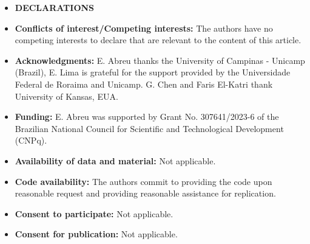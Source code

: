\documentclass[11pt]{article}
\begin{document}
\begin{itemize}
	\item[] {\bf DECLARATIONS}
	
	\vspace{-2mm}
	\item[] {\bf Conflicts of interest/Competing interests:} The authors have no competing interests to declare that are relevant to the content of this article.
	
	\vspace{-2mm}
	\item[] {\bf Acknowledgments:} E. Abreu thanks the University of Campinas - Unicamp (Brazil), E. Lima is grateful for the support provided by the Universidade Federal de Roraima and Unicamp. G. Chen and Faris El-Katri thank University of Kansas, EUA.
	
	\vspace{-2mm}
	\item[] {\bf Funding:} E. Abreu was supported by Grant No. 307641/2023-6 of the Brazilian National Council for Scientific and Technological Development (CNPq).
	
	\vspace{-2mm}
	\item[] {\bf Availability of data and material:} Not applicable.
	
	\vspace{-2mm}
	\item[] {\bf Code availability:} The authors commit to providing the code upon reasonable request and providing reasonable assistance for replication.
	
	\vspace{-2mm}
	\item[] {\bf Consent to participate:} Not applicable.
	
	\vspace{-2mm}
	\item[] {\bf Consent for publication:} Not applicable.
	
\end{itemize}
	



\end{document}
